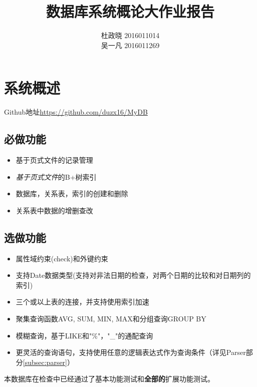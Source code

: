 \documentclass[11pt,UTF8]{report}
\title{数据库系统概论大作业报告}
\author{杜政晓 2016011014\\
吴一凡 2016011269}
\begin{document}
\maketitle

\section{系统概述}
Github地址\url{https://github.com/duzx16/MyDB}
\subsection{必做功能}
\begin{itemize}
	\item 基于页式文件的记录管理
	\item \emph{基于页式文件}的B+树索引
	\item 数据库，关系表，索引的创建和删除
	\item 关系表中数据的增删查改
\end{itemize}

\subsection{选做功能}
\begin{itemize}
	\item 属性域约束(check)和外键约束
	\item 支持Date数据类型(支持对非法日期的检查，对两个日期的比较和对日期列的索引)
	\item 三个或以上表的连接，并支持使用索引加速
	\item 聚集查询函数AVG, SUM, MIN, MAX和分组查询GROUP BY
	\item 模糊查询，基于LIKE和"\%"，"\_"的通配查询
	\item 更灵活的查询语句，支持使用任意的逻辑表达式作为查询条件（详见Parser部分\ref{subsec:parser}）
\end{itemize}

本数据库在检查中已经通过了基本功能测试和\textbf{全部的}扩展功能测试。
\end{document}
